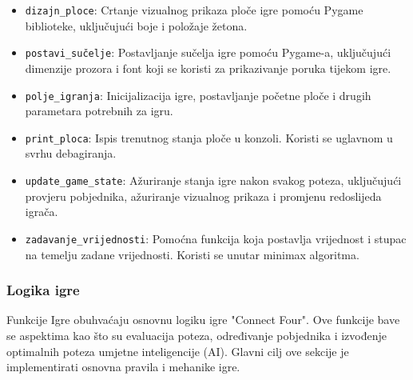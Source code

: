 \documentclass[]{foi}
\begin{document}
\begin{itemize}
    \item \texttt{dizajn\_ploce}: Crtanje vizualnog prikaza ploče igre pomoću Pygame biblioteke, uključujući boje i položaje žetona.
    \item \texttt{postavi\_sučelje}: Postavljanje sučelja igre pomoću Pygame-a, uključujući dimenzije prozora i font koji se koristi za prikazivanje poruka tijekom igre.
    \item \texttt{polje\_igranja}: Inicijalizacija igre, postavljanje početne ploče i drugih parametara potrebnih za igru.
    \item \texttt{print\_ploca}:  Ispis trenutnog stanja ploče u konzoli. Koristi se uglavnom u svrhu debagiranja.
    \item \texttt{update\_game\_state}: Ažuriranje stanja igre nakon svakog poteza, uključujući provjeru pobjednika, ažuriranje vizualnog prikaza i promjenu redoslijeda igrača.
    \item \texttt{zadavanje\_vrijednosti}: Pomoćna funkcija koja postavlja vrijednost i stupac na temelju zadane vrijednosti. Koristi se unutar minimax algoritma.
\end{itemize}

\subsubsection{Logika igre}

Funkcije Igre obuhvaćaju osnovnu logiku igre "Connect Four". Ove funkcije bave se aspektima kao što su evaluacija poteza, određivanje pobjednika i izvođenje optimalnih poteza umjetne inteligencije (AI). Glavni cilj ove sekcije je implementirati osnovna pravila i mehanike igre.
\end{document}
